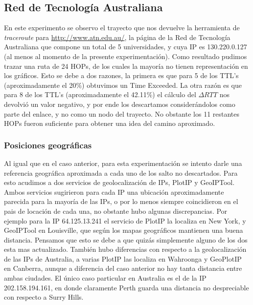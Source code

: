 \clearpage

\subsection{Red de Tecnología Australiana}

En este experimento se observo el trayecto que nos devuelve la herramienta de
\textit{traceroute} para \url{http://www.atn.edu.au/}, la página de la Red de
Tecnología Australiana que compone un total de 5 universidades, y cuya IP es
130.220.0.127 (al menos al momento de la presente experimentación). Como
resultado pudimos trazar una ruta de 24 HOPs, de los cuales la mayoría no
tienen representación en los gráficos. Esto se debe a dos razones, la primera
es que para 5 de los TTL's (aproximadamente el 20\%) obtuvimos un Time
Exceeded. La otra razón es que para 8 de los TTL's (aproximadamente el 42.11\%)
el cálculo del $\Delta RTT$ nos devolvió un valor negativo, y por ende los
descartamos considerándolos como parte del enlace, y no como un nodo del
trayecto. No obstante los 11 restantes HOPs fueron suficiente para obtener una
idea del camino aproximado.

\subsubsection{Posiciones geográficas}

Al igual que en el caso anterior, para esta experimentación se intento darle
una referencia geográfica aproximada a cada uno de los salto no descartados.
Para esto acudimos a dos servicios de geolocalización de IPs, PlotIP y
GeoIPTool. Ambos servicios sugirieron para cada IP una ubicación
aproximadamente parecida para la mayoría de las IPs, o por lo menos siempre
coincidieron en el pais de locación de cada una, no obstante hubo algunas
discrepancias. Por ejemplo para la IP 64.125.13.241 el servicio de PlotIP la
localiza en New York, y GeoIPTool en Louisville, que según los mapas
geográficos mantienen una buena distancia. Pensamos que esto se debe a que
quizás simplemente alguno de los dos esta mas actualizado. También hubo
diferencias con respecto a la geolocalización de las IPs de Australia, a varias
PlotIP las localiza en Wahroonga y GeoPlotIP en Canberra, aunque a diferencia
del caso anterior no hay tanta distancia entre ambas ciudades. El único caso
particular en Australia es el de la IP 202.158.194.161, en donde claramente
Perth guarda una distancia no despreciable con respecto a Surry Hills.

